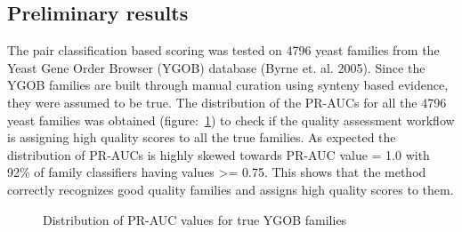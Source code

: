 \documentclass{article}
\begin{document}
		\subsection{Preliminary results}
		The pair classification based scoring was tested on 4796 yeast families from the Yeast Gene Order Browser (YGOB) database (Byrne et. al. 2005). Since the YGOB families are built through manual curation using synteny based evidence, they were assumed to be true. The distribution of the PR-AUCs for all the 4796 yeast families was obtained (figure:~\ref{fig:hist_pr-auc_true_ygob}) to check if the quality assessment workflow is assigning high quality scores to all the true families. As expected the distribution of PR-AUCs is highly skewed towards PR-AUC value = 1.0 with 92\% of family classifiers having values >= 0.75. This shows that the method correctly recognizes good quality families and assigns high quality scores to them.
		
		\begin{figure}
			\caption{Distribution of PR-AUC values for true YGOB families}
			\label{fig:hist_pr-auc_true_ygob}
		\end{figure}
		
\end{document}
